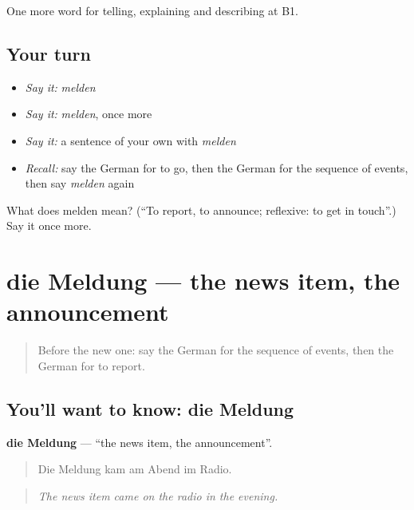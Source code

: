 \begin{grammarlens}[title={What you've built}]
One more word for telling, explaining and describing at B1.
\end{grammarlens}

\subsection*{Your turn}
\begin{itemize}
\raggedright
  \item \emph{Say it:} \emph{melden}
  \item \emph{Say it:} \emph{melden}, once more
  \item \emph{Say it:} a sentence of your own with \emph{melden}
  \item \emph{Recall:} say the German for to go, then the German for the sequence of events, then say \emph{melden} again
\end{itemize}

\begin{tcolorbox}[breakable,colback=teal!4,colframe=teal!35!black,title={Before you move on}]
What does melden mean? (\textquotedblleft{}To report, to announce; reflexive: to get in touch\textquotedblright{}.) Say it once more.
\end{tcolorbox}
\section[die Meldung]{die Meldung — the news item, the announcement}

\label{lesson:GE-C271-meldung}



\begin{quote}
Before the new one: say the German for the sequence of events, then the German for to report.
\end{quote}

\subsection*{You'll want to know: die Meldung}
\textbf{die Meldung} — \textquotedblleft{}the news item, the announcement\textquotedblright{}.

\begin{quote}
Die Meldung kam am Abend im Radio.
\end{quote}

\begin{quote}
\emph{The news item came on the radio in the evening.}
\end{quote}

